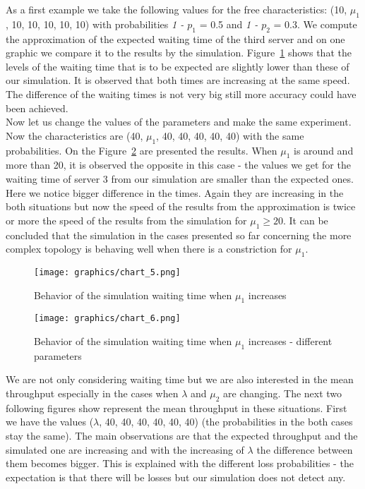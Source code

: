 \documentclass[12pt]{article}
\theoremstyle{plain}
\begin{document}
As a first example we take the following values for the free characteristics:
(10, $\mu_1$, 10, 10, 10, 10, 10) with probabilities \emph{1 - $p_1$} = 0.5 and
\emph{1 - $p_2$} = 0.3. We compute the approximation of the expected waiting
time of the third server and on one graphic we compare it to the results by the
simulation. Figure~\ref{fig:waiting_time1} shows that the levels of the waiting time that is to
be expected are slightly lower than these of our simulation. It is observed that
both times are increasing at the same speed. The difference of the waiting times
is not very big still more accuracy could have been achieved.\\
Now let us change the values of the parameters and make the same experiment. Now
the characteristics are (40, $\mu_1$, 40, 40, 40, 40, 40) with the same probabilities.
On the Figure~\ref{fig:waiting_time2} are presented the results. When $\mu_1$
is around and more than 20, it is observed the opposite in this case - the
values we get for the waiting time of server 3 from our simulation are smaller
than the expected ones. Here we notice bigger difference in the times. Again
they are increasing in the both situations but now the speed of the results
from the approximation is twice or more the speed of the results from the
simulation for $\mu_1 \ge 20$.  It can be concluded that the simulation in the
cases presented so far concerning the more complex topology is behaving well
when there is a constriction for $\mu_1$. 

\begin{figure}[h]
  \caption{Behavior of the simulation waiting time when $\mu_1$ increases}
  \texttt{[image: graphics/chart\_5.png]}
  \label{fig:waiting_time1}
\end{figure}

\begin{figure}[h]
  \caption{Behavior of the simulation waiting time when $\mu_1$ increases - different parameters}
  \texttt{[image: graphics/chart\_6.png]}
  \label{fig:waiting_time2}
\end{figure}

We are not only considering waiting time but we are also interested in the mean
throughput especially in the cases when $\lambda$ and $\mu_2$ are changing.
The next two following figures show represent the mean throughput in these situations.
First we have the values ($\lambda$, 40, 40, 40, 40, 40, 40) (the probabilities in
the both cases stay the same). The main observations are that the expected throughput
and the simulated one are increasing and with the increasing of $\lambda$ the
difference between them becomes bigger. This is explained with the different loss
probabilities - the expectation is that there will be losses but our simulation
does not detect any.
\end{document}
